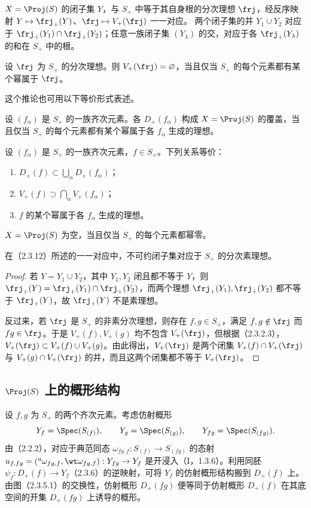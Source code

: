 $X=\Proj(S)$ 的闭子集 $Y$，与 $S_+$ 中等于其自身根的分次理想 $\frj$，经反序映射
$Y\mapsto\frj_+(Y)$、$\frj\mapsto V_+(\frj)$ 一一对应。
两个闭子集的并 $Y_1\cup Y_2$ 对应于 $\frj_+(Y_1)\cap\frj_+(Y_2)$；任意一族闭子集 $(Y_\lambda)$ 的交，对应于各 $\frj_+(Y_\lambda)$ 的和在 $S_+$ 中的根。

设 $\frj$ 为 $S_+$ 的分次理想。则 $V_+(\frj)=\varnothing$，当且仅当 $S_+$ 的每个元素都有某个幂属于 $\frj$。

这个推论也可用以下等价形式表述。

设 $(f_\alpha)$ 是 $S_+$ 的一族齐次元素。各 $D_+(f_\alpha)$ 构成 $X=\Proj(S)$ 的覆盖，当且仅当 $S_+$ 的每个元素都有某个幂属于各 $f_\alpha$ 生成的理想。

设 $(f_\alpha)$ 是 $S_+$ 的一族齐次元素，$f\in S_+$。下列关系等价：
\begin{enumerate}[label=\alph*)]
\item $D_+(f)\subset\bigcup_\alpha D_+(f_\alpha)$；
\item $V_+(f)\supset\bigcap_\alpha V_+(f_\alpha)$；
\item $f$ 的某个幂属于各 $f_\alpha$ 生成的理想。
\end{enumerate}

$X=\Proj(S)$ 为空，当且仅当 $S_+$ 的每个元素都幂零。

在（2.3.12）所述的一一对应中，不可约闭子集对应于 $S_+$ 的分次素理想。
\begin{proof}
若 $Y=Y_1\cup Y_2$，其中 $Y_1,Y_2$ 闭且都不等于 $Y$，则
$\frj_+(Y)=\frj_+(Y_1)\cap\frj_+(Y_2)$，而两个理想 $\frj_+(Y_1),\frj_+(Y_2)$ 都不等于 $\frj_+(Y)$，故 $\frj_+(Y)$ 不是素理想。

反过来，若 $\frj$ 是 $S_+$ 的非素分次理想，则存在 $f,g\in S_+$，满足
$f,g\notin\frj$ 而 $fg\in\frj$。于是 $V_+(f),V_+(g)$ 均不包含 $V_+(\frj)$，但根据（2.3.2.3），
$V_+(\frj)\subset V_+(f)\cup V_+(g)$。由此得出，$V_+(\frj)$ 是两个闭集
$V_+(f)\cap V_+(\frj)$ 与 $V_+(g)\cap V_+(\frj)$ 的并，而且这两个闭集都不等于 $V_+(\frj)$。
\end{proof}

\subsection{\texorpdfstring{$\Proj(S)$}{Proj(S)} 上的概形结构}
设 $f,g$ 为 $S_+$ 的两个齐次元素。考虑仿射概形
\[
Y_f=\Spec(S_{(f)}),\qquad Y_g=\Spec(S_{(g)}),\qquad
Y_{fg}=\Spec(S_{(fg)}).
\]
由（2.2.2），对应于典范同态
$\omega_{fg,f}:S_{(f)}\to S_{(fg)}$ 的态射
$u_{f,fg}=({}^{a}\omega_{fg,f},\wt\omega_{fg,f}):Y_{fg}\to Y_f$ 是开浸入（I，1.3.6）。利用同胚
$\psi_f:D_+(f)\to Y_f$（2.3.6）的逆映射，可将 $Y_f$ 的仿射概形结构搬到 $D_+(f)$ 上。由图（2.3.5.1）的交换性，仿射概形 $D_+(fg)$ 便等同于仿射概形 $D_+(f)$ 在其底空间的开集 $D_+(fg)$ 上诱导的概形。

